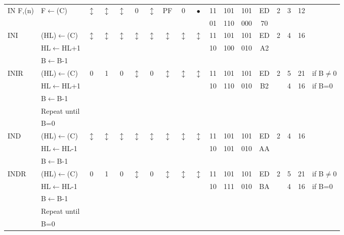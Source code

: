 \documentclass[oneside,a4paper]{book}
\begin{document}
{\begin{tabular}{llcccccccccccccccl}
		IN F,(n)\instrt & 
			F$\leftarrow$(C) & 
			$\updownarrow$ & 
				$\updownarrow$ & 
				$\updownarrow$ & 
				0 & 
				$\updownarrow$ & 
				PF & 
				0 & 
				$\bullet$ & 
			11 & 101 & 101 & 
			ED & 2 & 
			3 & 12 & \\
			\multicolumn{10}{c}{} & 01 & 110 & 000 & 70 & \instrb \\

		INI\instrt & 
			(HL)$\leftarrow$(C) & 
			$\updownarrow$\footnotemark[1] & 
				$\updownarrow$\footnotemark[1] & 
				$\updownarrow$\footnotemark[1] & 
				$\updownarrow$\footnotemark[3] & 
				$\updownarrow$\footnotemark[1] & 
				$\updownarrow$\footnotemark[3] & 
				$\updownarrow$\footnotemark[2] & 
				$\updownarrow$\footnotemark[3] & 
			11 & 101 & 101 & 
			ED & 2 & 
			4 & 16 & \\
			& HL$\leftarrow$HL+1 & \multicolumn{8}{c}{} & 10 & 100 & 010 & A2 & \\
			& B$\leftarrow$B-1 & \instrb \\

		INIR\instrt & 
			(HL)$\leftarrow$(C) & 
			0 & 
				1 & 
				0 & 
				$\updownarrow$\footnotemark[3] & 
				0 & 
				$\updownarrow$\footnotemark[3] & 
				$\updownarrow$\footnotemark[2] & 
				$\updownarrow$\footnotemark[3] &
			11 & 101 & 101 & 
			ED & 2 & 
			5 & 21 & {if B$\not=$0} \\
			& HL$\leftarrow$HL+1 & \multicolumn{8}{c}{} & 10 & 110 & 010 & B2 & & 4 & 16 & {if B=0} \\
			& B$\leftarrow$B-1 \\
			& Repeat until \\
			& B=0 & \instrb \\

		IND\instrt & 
			(HL)$\leftarrow$(C) & 
			$\updownarrow$\footnotemark[1] & 
				$\updownarrow$\footnotemark[1] & 
				$\updownarrow$\footnotemark[1] & 
				$\updownarrow$\footnotemark[3] & 
				$\updownarrow$\footnotemark[1] & 
				$\updownarrow$\footnotemark[3] & 
				$\updownarrow$\footnotemark[2] & 
				$\updownarrow$\footnotemark[4] & 
			11 & 101 & 101 & 
			ED & 2 & 
			4 & 16 & \\
			& HL$\leftarrow$HL-1 & \multicolumn{8}{c}{} & 10 & 101 & 010 & AA & \\
			& B$\leftarrow$B-1 & \instrb \\

		INDR\instrt & 
			(HL)$\leftarrow$(C) & 
			0 & 
				1 & 
				0 & 
				$\updownarrow$\footnotemark[3] & 
				0 & 
				$\updownarrow$\footnotemark[3] & 
				$\updownarrow$\footnotemark[2] & 
				$\updownarrow$\footnotemark[3] & 
			11 & 101 & 101 & 
			ED & 2 & 
			5 & 21 & {if B$\not=$0} \\
			& HL$\leftarrow$HL-1 & \multicolumn{8}{c}{} & 10 & 111 & 010 & BA &  & 4 & 16 & {if B=0} \\
			& B$\leftarrow$B-1 \\
			& Repeat until \\
			& B=0 & \instrb \\


\end{tabular}}
\end{document}
